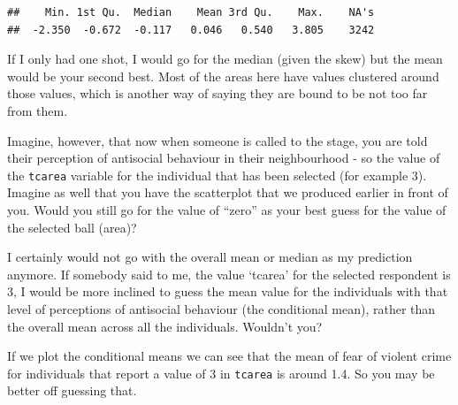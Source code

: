 \documentclass[]{book}
\newenvironment{Shaded}{\begin{snugshade}}{\end{snugshade}}
\newcommand{\KeywordTok}[1]{\textcolor[rgb]{0.13,0.29,0.53}{\textbf{#1}}}
\newcommand{\NormalTok}[1]{#1}
\newcommand{\OperatorTok}[1]{\textcolor[rgb]{0.81,0.36,0.00}{\textbf{#1}}}
\theoremstyle{definition}
\theoremstyle{definition}
\theoremstyle{definition}
\theoremstyle{remark}
\begin{document}
\begin{Shaded}
\end{Shaded}

\begin{verbatim}
##    Min. 1st Qu.  Median    Mean 3rd Qu.    Max.    NA's 
##  -2.350  -0.672  -0.117   0.046   0.540   3.805    3242
\end{verbatim}

If I only had one shot, I would go for the median (given the skew) but
the mean would be your second best. Most of the areas here have values
clustered around those values, which is another way of saying they are
bound to be not too far from them.

Imagine, however, that now when someone is called to the stage, you are
told their perception of antisocial behaviour in their neighbourhood -
so the value of the \texttt{tcarea} variable for the individual that has
been selected (for example 3). Imagine as well that you have the
scatterplot that we produced earlier in front of you. Would you still go
for the value of ``zero'' as your best guess for the value of the
selected ball (area)?

I certainly would not go with the overall mean or median as my
prediction anymore. If somebody said to me, the value `tcarea' for the
selected respondent is 3, I would be more inclined to guess the mean
value for the individuals with that level of perceptions of antisocial
behaviour (the conditional mean), rather than the overall mean across
all the individuals. Wouldn't you?

If we plot the conditional means we can see that the mean of fear of
violent crime for individuals that report a value of 3 in
\texttt{tcarea} is around 1.4. So you may be better off guessing that.
\end{document}
